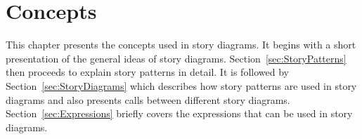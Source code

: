 \chapter{Concepts} \label{sec:Concepts}

This chapter presents the concepts used in story diagrams. It begins with a short presentation of the general ideas of story diagrams. Section~\ref{sec:StoryPatterns} then proceeds to explain story patterns in detail. It is followed by Section~\ref{sec:StoryDiagrams} which describes how story patterns are used in story diagrams and also presents calls between different story diagrams. Section~\ref{sec:Expressions} briefly covers the expressions that can be used in story diagrams.

	

	 
	
	

	
	
\ext{
	
}


